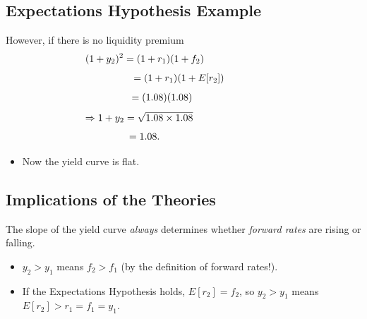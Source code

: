 \documentclass[letterpaper,10pt,english]{sphinxmanual}
\begin{document}
\subsection{Expectations Hypothesis Example}
\label{termStructure:expectations-hypothesis-example}
However, if there is no liquidity premium
\begin{gather}
\begin{split}(1+y_2)^2 & = (1+r_1)(1+f_2) \hspace{0.95in}\end{split}\notag
\end{gather}\begin{gather}
\begin{split}& = (1+r_1)(1+E[r_2]) \hspace{0.02in}\end{split}\notag
\end{gather}\begin{gather}
\begin{split}& = (1.08)(1.08) \hspace{0.5in}\end{split}\notag
\end{gather}\begin{gather}
\begin{split}\Rightarrow 1+y_2 & = \sqrt{1.08 \times 1.08} \hspace{1.1in}\end{split}\notag
\end{gather}\begin{gather}
\begin{split}& = 1.08. \hspace{1in}\end{split}\notag
\end{gather}\begin{itemize}
\item {} 
Now the yield curve is flat.

\end{itemize}


\subsection{Implications of the Theories}
\label{termStructure:implications-of-the-theories}
The slope of the yield curve \emph{always} determines whether \emph{forward
rates} are rising or falling.
\begin{itemize}
\item {} 
$y_2 > y_1$ means $f_2 > f_1$ (by the definition of
forward rates!).

\end{itemize}
\begin{itemize}
\item {} 
If the Expectations Hypothesis holds, $E[r_2] = f_2$, so
$y_2 > y_1$ means $E[r_2] > r_1 = f_1 = y_1$.

\end{itemize}
\end{document}
